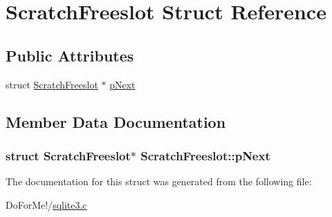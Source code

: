 \hypertarget{struct_scratch_freeslot}{\section{Scratch\-Freeslot Struct Reference}
\label{struct_scratch_freeslot}
}
\subsection*{Public Attributes}
\begin{DoxyCompactItemize}
\item 
struct \hyperlink{struct_scratch_freeslot}{Scratch\-Freeslot} $\ast$ \hyperlink{struct_scratch_freeslot_aca5c55a56a2a63a5be0756707a04bee8}{p\-Next}
\end{DoxyCompactItemize}


\subsection{Member Data Documentation}
\hypertarget{struct_scratch_freeslot_aca5c55a56a2a63a5be0756707a04bee8}{
\subsubsection[{p\-Next}]{\setlength{\rightskip}{0pt plus 5cm}struct {\bf Scratch\-Freeslot}$\ast$ Scratch\-Freeslot\-::p\-Next}}\label{struct_scratch_freeslot_aca5c55a56a2a63a5be0756707a04bee8}


The documentation for this struct was generated from the following file\-:\begin{DoxyCompactItemize}
\item 
Do\-For\-Me!/\hyperlink{sqlite3_8c}{sqlite3.\-c}\end{DoxyCompactItemize}
